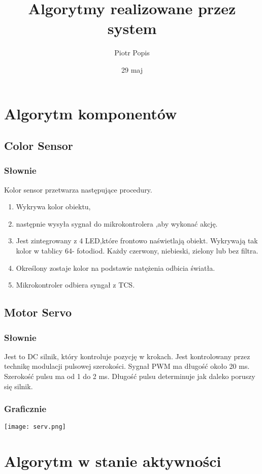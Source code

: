 \documentclass[11pt]{article}
\author{Piotr Popis}
\title{ Algorytmy realizowane przez system}
\date{29 maj}
\begin{document}
\begin{titlepage}
\maketitle 
\end{titlepage}
\section{Algorytm komponentów}
\subsection{Color Sensor}
\subsubsection{Słownie}
Kolor sensor przetwarza następujące procedury.
\begin{enumerate}

\item Wykrywa kolor obiektu, \item następnie wysyła sygnał do mikrokontrolera ,aby wykonać akcję.\item  Jest zintegrowany z 4 LED,które frontowo naświetlają obiekt. Wykrywają tak kolor w tablicy 64- fotodiod. Każdy czerwony, niebieski, zielony lub bez filtra. \item Określony zostaje kolor na podstawie natężenia odbicia światła. \item Mikrokontroler odbiera syngał z TCS.
\end{enumerate}
\subsection{Motor Servo}
\subsubsection{Słownie}
Jest to DC silnik, który kontroluje pozycję w krokach. Jest kontrolowany przez technikę modulacji pulsowej szerokości. Sygnał PWM ma długość około 20 ms. Szerokość pulsu ma od 1 do 2 ms. Długość pulsu determinuje jak daleko poruszy się silnik.
\subsubsection{Graficznie}
\texttt{[image: serv.png]}

\section{Algorytm w stanie aktywności}
\end{document}
